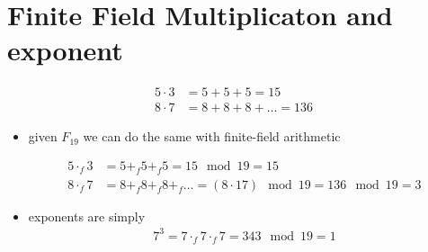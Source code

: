 \documentclass[11pt]{article}
\begin{document}
\section{Finite Field Multiplicaton and exponent}
\label{sec:org7ce4f71}
\begin{align*}
5 \cdot 3 &= 5 + 5 + 5 = 15\\
8 \cdot 7 &= 8 + 8 + 8 + \dots = 136 
\end{align*}

\begin{itemize}
\item given \(F_{19}\) we can do the same with finite-field arithmetic

\begin{align*}
5 \cdot_f 3 &= 5 +_f 5 +_f 5 = 15\mod 19 = 15\\
8 \cdot_f 7 &= 8 +_f 8 +_f 8 +_f \dots = (8 \cdot 17) \mod 19 = 136 \mod 19 = 3
\end{align*}

\item exponents are simply
\begin{align*}
7^3 = 7 \cdot_f 7 \cdot_f 7 = 343 \mod 19 = 1
\end{align*}
\end{itemize}
\end{document}
